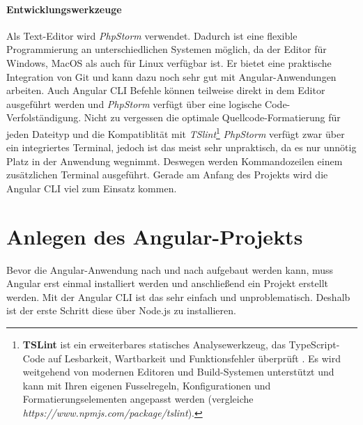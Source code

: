 \paragraph{Entwicklungswerkzeuge} Als Text-Editor wird \textit{PhpStorm} verwendet. Dadurch ist eine flexible Programmierung an unterschiedlichen Systemen möglich, da der Editor für Windows, MacOS als auch für Linux verfügbar ist. Er bietet eine praktische Integration von Git und kann dazu noch sehr gut mit Angular-Anwendungen arbeiten. Auch Angular CLI Befehle können teilweise direkt in dem Editor ausgeführt werden und \textit{PhpStorm} verfügt über eine logische Code-Verfolständigung. Nicht zu vergessen die optimale Quellcode-Formatierung für jeden Dateityp und die Kompatiblität mit \textit{TSlint}\footnote{\textbf{TSLint} ist ein erweiterbares statisches Analysewerkzeug, das TypeScript- Code auf Lesbarkeit, Wartbarkeit und Funktionsfehler überprüft . Es wird weitgehend von modernen Editoren und Build-Systemen unterstützt und kann mit Ihren eigenen Fusselregeln, Konfigurationen und Formatierungselementen angepasst werden (vergleiche \textit{https://www.npmjs.com/package/tslint}).} \textit{PhpStorm} verfügt zwar über ein integriertes Terminal, jedoch ist das meist sehr unpraktisch, da es nur unnötig Platz in der Anwendung wegnimmt. Deswegen werden Kommandozeilen einem zusätzlichen Terminal ausgeführt. Gerade am Anfang des Projekts wird die Angular CLI viel zum Einsatz kommen.
%
\section{Anlegen des Angular-Projekts}
\label{sec:umsetzung}
%
Bevor die Angular-Anwendung nach und nach aufgebaut werden kann, muss Angular erst einmal installiert werden und anschließend ein Projekt erstellt werden. Mit der Angular CLI ist das sehr einfach und unproblematisch. Deshalb ist der erste Schritt diese über Node.js zu installieren.
%

